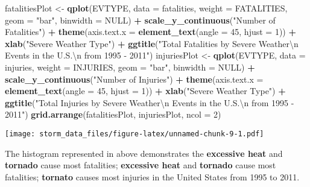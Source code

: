 \documentclass[]{article}
\newenvironment{Shaded}{\begin{snugshade}}{\end{snugshade}}
\newcommand{\KeywordTok}[1]{\textcolor[rgb]{0.13,0.29,0.53}{\textbf{#1}}}
\newcommand{\DataTypeTok}[1]{\textcolor[rgb]{0.13,0.29,0.53}{#1}}
\newcommand{\DecValTok}[1]{\textcolor[rgb]{0.00,0.00,0.81}{#1}}
\newcommand{\CharTok}[1]{\textcolor[rgb]{0.31,0.60,0.02}{#1}}
\newcommand{\StringTok}[1]{\textcolor[rgb]{0.31,0.60,0.02}{#1}}
\newcommand{\OtherTok}[1]{\textcolor[rgb]{0.56,0.35,0.01}{#1}}
\newcommand{\OperatorTok}[1]{\textcolor[rgb]{0.81,0.36,0.00}{\textbf{#1}}}
\newcommand{\NormalTok}[1]{#1}
\begin{document}
\begin{Shaded}
\begin{Highlighting}[]
\NormalTok{fatalitiesPlot <-}\StringTok{ }\KeywordTok{qplot}\NormalTok{(EVTYPE, }\DataTypeTok{data =}\NormalTok{ fatalities, }\DataTypeTok{weight =}\NormalTok{ FATALITIES, }\DataTypeTok{geom =} \StringTok{"bar"}\NormalTok{, }\DataTypeTok{binwidth =} \OtherTok{NULL}\NormalTok{) }\OperatorTok{+}
\StringTok{    }\KeywordTok{scale_y_continuous}\NormalTok{(}\StringTok{"Number of Fatalities"}\NormalTok{) }\OperatorTok{+}\StringTok{ }
\StringTok{    }\KeywordTok{theme}\NormalTok{(}\DataTypeTok{axis.text.x =} \KeywordTok{element_text}\NormalTok{(}\DataTypeTok{angle =} \DecValTok{45}\NormalTok{, }
    \DataTypeTok{hjust =} \DecValTok{1}\NormalTok{)) }\OperatorTok{+}\StringTok{ }\KeywordTok{xlab}\NormalTok{(}\StringTok{"Severe Weather Type"}\NormalTok{) }\OperatorTok{+}\StringTok{ }
\StringTok{    }\KeywordTok{ggtitle}\NormalTok{(}\StringTok{"Total Fatalities by Severe Weather}\CharTok{\textbackslash{}n}\StringTok{ Events in the U.S.}\CharTok{\textbackslash{}n}\StringTok{ from 1995 - 2011"}\NormalTok{)}
\NormalTok{injuriesPlot <-}\StringTok{ }\KeywordTok{qplot}\NormalTok{(EVTYPE, }\DataTypeTok{data =}\NormalTok{ injuries, }\DataTypeTok{weight =}\NormalTok{ INJURIES, }\DataTypeTok{geom =} \StringTok{"bar"}\NormalTok{, }\DataTypeTok{binwidth =} \OtherTok{NULL}\NormalTok{) }\OperatorTok{+}\StringTok{ }
\StringTok{    }\KeywordTok{scale_y_continuous}\NormalTok{(}\StringTok{"Number of Injuries"}\NormalTok{) }\OperatorTok{+}\StringTok{ }
\StringTok{    }\KeywordTok{theme}\NormalTok{(}\DataTypeTok{axis.text.x =} \KeywordTok{element_text}\NormalTok{(}\DataTypeTok{angle =} \DecValTok{45}\NormalTok{, }
    \DataTypeTok{hjust =} \DecValTok{1}\NormalTok{)) }\OperatorTok{+}\StringTok{ }\KeywordTok{xlab}\NormalTok{(}\StringTok{"Severe Weather Type"}\NormalTok{) }\OperatorTok{+}\StringTok{ }
\StringTok{    }\KeywordTok{ggtitle}\NormalTok{(}\StringTok{"Total Injuries by Severe Weather}\CharTok{\textbackslash{}n}\StringTok{ Events in the U.S.}\CharTok{\textbackslash{}n}\StringTok{ from 1995 - 2011"}\NormalTok{)}
\KeywordTok{grid.arrange}\NormalTok{(fatalitiesPlot, injuriesPlot, }\DataTypeTok{ncol =} \DecValTok{2}\NormalTok{)}
\end{Highlighting}
\end{Shaded}

\texttt{[image: storm\_data\_files/figure-latex/unnamed-chunk-9-1.pdf]}

The histogram represented in above demonstrates the \textbf{excessive
heat} and \textbf{tornado} cause most fatalities; \textbf{excessive
heat} and \textbf{tornado} cause most fatalities; \textbf{tornato}
causes most injuries in the United States from 1995 to 2011.
\end{document}
